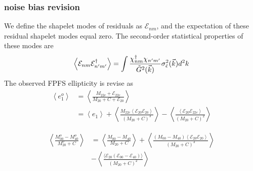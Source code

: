 \subsubsection{noise bias revision}
We define the shapelet modes of residuals as $\mathcal{E}_{nm}$, and the
expectation of these residual shapelet modes equal zero. The second-order
statistical properties of these modes are
\begin{equation}
    \left\langle \mathcal{E}_{nm}\mathcal{E}^{\dagger}_{n'm'} \right\rangle
    =\int \frac{\chi^\dagger_{nm}\chi_{n'm'}}{\tilde{G}^2(\vec{k})}
    \sigma^2_{\tilde{\epsilon}}(\vec{k})d^2k\\
\end{equation}
The observed FPFS ellipticity is revise as
\begin{equation}
    \begin{split}
    \left\langle e^o_1\right\rangle
    &=\left\langle\frac{M_{22c}+\mathcal{E}_{22c}}
        {M_{20}+C+\mathcal{E}_{20}}\right\rangle\\
    &=\left\langle e_1\right\rangle+
        \left\langle
        \frac{M_{22c}\left\langle\mathcal{E}_{20}\mathcal{E}_{20}\right\rangle}
        {(M_{20}+C)^3}
        \right\rangle
    -\left\langle
    \frac{\left\langle\mathcal{E}_{20}\mathcal{E}_{22c}\right\rangle}
        {(M_{20}+C)^2}
    \right\rangle
    \end{split}
\end{equation}

\begin{equation}
    \begin{split}
    \left\langle \frac{M^o_{00}-M^o_{40}}{M^o_{20}+C}\right\rangle
    &=\left\langle
        \frac{M_{00}-M_{40}}{M_{20}+C}\right\rangle+\left\langle
        \frac{\left(M_{00}-M_{40}\right)
            \left\langle\mathcal{E}_{20}\mathcal{E}_{20}\right\rangle}
        {(M_{20}+C)^3}
        \right\rangle\\
    &-\left\langle
    \frac{\langle\mathcal{E}_{20}
    (\mathcal{E}_{00}-\mathcal{E}_{40})\rangle}
    {(M_{20}+C)^2}
    \right\rangle
    \end{split}
\end{equation}


